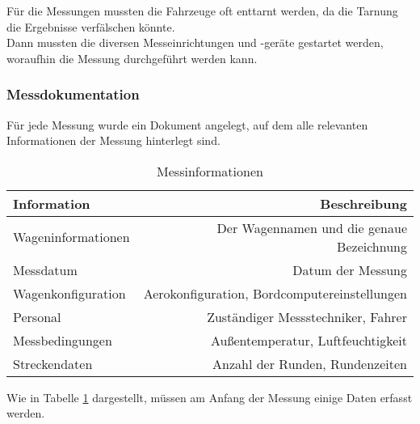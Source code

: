 Für die Messungen mussten die Fahrzeuge oft enttarnt werden, da die Tarnung die Ergebnisse verfälschen könnte.\\
Dann mussten die diversen Messeinrichtungen und -geräte gestartet werden, woraufhin die Messung durchgeführt werden kann. \\

\subsubsection{Messdokumentation}

Für jede Messung wurde ein Dokument angelegt, auf dem alle relevanten Informationen der Messung hinterlegt sind. 

\begin{table}[H]
	\begin{center}
		\begin{tabular}{l|r}
			\textbf{Information} & \textbf{Beschreibung}\\
			\hline
			Wageninformationen & Der Wagennamen und die genaue Bezeichnung\\
			Messdatum & Datum der Messung\\
			Wagenkonfiguration & Aerokonfiguration, Bordcomputereinstellungen\\
			Personal & Zuständiger Messstechniker, Fahrer\\
			Messbedingungen & Außentemperatur, Luftfeuchtigkeit\\
			Streckendaten & Anzahl der Runden, Rundenzeiten\\
		\end{tabular}
	
	\caption{Messinformationen}
	\label{MessTable}
	\end{center}
\end{table}

Wie in Tabelle \ref{MessTable} dargestellt, müssen am Anfang der Messung einige Daten erfasst werden.



